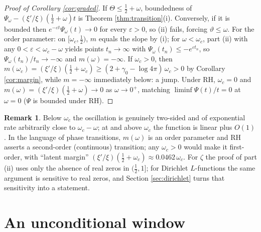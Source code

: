 \documentclass[11pt,reqno]{amsart}
\theoremstyle{plain}
\theoremstyle{definition}
\newtheorem{remark}[theorem]{Remark}
\begin{document}
\begin{proof}[Proof of Corollary \ref{cor:graded}]
If $\Theta\le\tfrac12+\omega$, boundedness of $\Psi_\omega-(\xi'/\xi)(\tfrac12+\omega)t$ is
Theorem \ref{thm:transition}(i). Conversely, if it is bounded then
$e^{-\varepsilon t}\Psi_\omega(t)\to0$ for every $\varepsilon>0$, so (ii) fails, forcing
$\vartheta\le\omega$. For the order parameter: on $[\omega_c,\tfrac12)$, $m$ equals the slope by
(i); for $\omega<\omega_c$, part (ii) with any $0<\varepsilon<\omega_c-\omega$ yields points
$t_n\to\infty$ with $\Psi_\omega(t_n)\le-e^{\varepsilon t_n}$, so
$\Psi_\omega(t_n)/t_n\to-\infty$ and $m(\omega)=-\infty$. If $\omega_c>0$, then
$m(\omega_c)=(\xi'/\xi)(\tfrac12+\omega_c)\ge(2+\gamma_0-\log4\pi)\,\omega_c>0$ by Corollary
\ref{cor:margin}, while $m=-\infty$ immediately below: a jump. Under RH, $\omega_c=0$ and
$m(\omega)=(\xi'/\xi)(\tfrac12+\omega)\to0$ as $\omega\to0^{+}$, matching
$\liminf\Psi(t)/t=0$ at $\omega=0$ ($\Psi$ is bounded under RH).
\end{proof}

\begin{remark}
Below $\omega_c$ the oscillation is genuinely two-sided and of exponential rate arbitrarily close
to $\omega_c-\omega$; at and above $\omega_c$ the function is linear plus $O(1)$. In the language
of phase transitions, $m(\omega)$ is an order parameter and RH asserts a second-order (continuous)
transition; any $\omega_c>0$ would make it first-order, with ``latent margin''
$(\xi'/\xi)(\tfrac12+\omega_c)\approx0.0462\,\omega_c$. For $\zeta$ the proof of part (ii) uses
only the absence of real zeros in $(\tfrac12,1]$; for Dirichlet $L$-functions the same argument is
sensitive to real zeros, and Section \ref{sec:dirichlet} turns that sensitivity into a statement.
\end{remark}

\section{An unconditional window}\label{sec:window}
\end{document}
